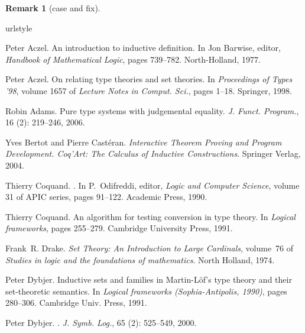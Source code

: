 \documentclass{LMCS}
\def\doi{7 (4:05) 2011}
\theoremstyle{plain}
\theoremstyle{definition}
\newtheorem{remm}[thm]{Remark}
\begin{document}
\begin{remm}[\textsf{case} and \textsf{fix}]

 \begin{thebibliography}{[10]}
\providecommand{\natexlab}[1]{#1}
\providecommand{\url}[1]{\texttt{#1}}
\expandafter\ifx\csname urlstyle\endcsname\relax
  \providecommand{\doi}[1]{doi: #1}\else
  \providecommand{\doi}{doi: \begingroup \urlstyle{rm}\Url}\fi

Peter Aczel.
\newblock An introduction to inductive definition.
\newblock In Jon Barwise, editor, \emph{Handbook of Mathematical Logic}, pages
  739--782. North-Holland, 1977.

Peter Aczel.
\newblock On relating type theories and set theories.
\newblock In \emph{Proceedings of Types '98}, volume 1657 of \emph{Lecture
  Notes in Comput. Sci.}, pages 1--18. Springer, 1998.

Robin Adams.
\newblock Pure type systems with judgemental equality.
\newblock \emph{J. Funct. Program.}, 16 (2): 219--246, 2006.

Yves Bertot and Pierre Cast\'eran.
\newblock \emph{Interactive Theorem Proving and Program Development. Coq'Art:
  The Calculus of Inductive Constructions}.
\newblock Springer Verlag, 2004.

Thierry Coquand.
.
\newblock In P.~Odifreddi, editor, \emph{Logic and Computer Science}, volume 31
  of APIC series, pages 91--122. Academic Press, 1990.

Thierry Coquand.
\newblock An algorithm for testing conversion in type theory.
\newblock In \emph{Logical frameworks}, pages 255--279. Cambridge University
  Press, 1991.

Frank~R. Drake.
\newblock \emph{Set Theory: An Introduction to Large Cardinals}, volume~76 of
  \emph{Studies in logic and the foundations of mathematics}.
\newblock North Holland, 1974.

Peter Dybjer.
\newblock Inductive sets and families in {M}artin-{L}\"of's type theory and
  their set-theoretic semantics.
\newblock In \emph{Logical frameworks (Sophia-Antipolis, 1990)}, pages
  280--306. Cambridge Univ. Press, 1991.

Peter Dybjer.
.
\newblock \emph{J. Symb. Log.}, 65 (2): 525--549, 2000.


\end{thebibliography}
\end{remm}
\end{document}
